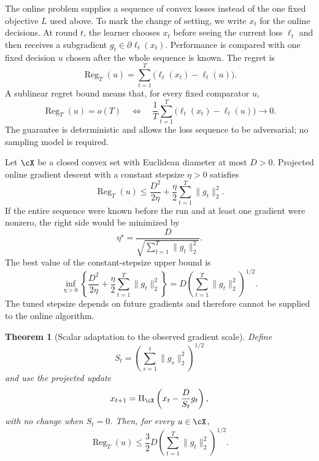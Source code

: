 \documentclass[11pt,twoside]{article}
\newtheorem{theorem}{Theorem}[section]
\theoremstyle{definition}
\theoremstyle{remark}
\begin{document}
The online problem supplies a sequence of convex losses instead of the one
fixed objective $L$ used above. To mark the change of setting, we write $x_t$
for the online decisions. At round $t$, the learner chooses $x_t$ before
seeing the current loss $\ell_t$ and then receives a subgradient
$g_t\in\partial\ell_t(x_t)$. Performance is compared with one fixed decision
$u$ chosen after the whole sequence is known. The regret is
\begin{equation}
 \operatorname{Reg}_T(u)
 =\sum_{t=1}^T\bigl(\ell_t(x_t)-\ell_t(u)\bigr).
 \label{eq:online-regret}
\end{equation}
A sublinear regret bound means that, for every fixed comparator $u$,
\begin{equation}
 \operatorname{Reg}_T(u)=o(T)
 \quad\Longleftrightarrow\quad
 \frac1T\sum_{t=1}^T
 \bigl(\ell_t(x_t)-\ell_t(u)\bigr)\longrightarrow0.
 \label{eq:sublinear-regret-meaning}
\end{equation}
The guarantee is deterministic and allows the loss sequence to be
adversarial; no sampling model is required.

Let $\cX$ be a closed convex set with Euclidean diameter at most $D>0$. Projected
online gradient descent with a constant stepsize $\eta>0$ satisfies
\begin{equation}
 \operatorname{Reg}_T(u)
 \le \frac{D^2}{2\eta}
      +\frac\eta2\sum_{t=1}^T\|g_t\|_2^2.
 \label{eq:fixed-eta-oco}
\end{equation}
If the entire sequence were known before the run and at least one gradient
were nonzero, the right side would be minimized by
\begin{equation}
 \eta^\star
 =\frac{D}{\sqrt{\sum_{t=1}^T\|g_t\|_2^2}}.
 \label{eq:hindsight-stepsize}
\end{equation}
The best value of the constant-stepsize upper bound is
\begin{equation}
 \inf_{\eta>0}
 \left\{
  \frac{D^2}{2\eta}
  +\frac\eta2\sum_{t=1}^T\|g_t\|_2^2
 \right\}
 =D\left(\sum_{t=1}^T\|g_t\|_2^2\right)^{1/2}.
 \label{eq:hindsight-bound-value}
\end{equation}
The tuned stepsize depends on future gradients and therefore cannot be
supplied to the online algorithm.

\begin{theorem}[Scalar adaptation to the observed gradient scale]
\label{thm:scalar-adaptation}
Define
\[
 S_t=\left(\sum_{s=1}^t\|g_s\|_2^2\right)^{1/2}
\]
and use the projected update
\begin{equation}
 x_{t+1}=\Pi_{\cX}\left(x_t-\frac{D}{S_t}g_t\right),
 \label{eq:scalar-adaptive-update}
\end{equation}
with no change when $S_t=0$. Then, for every $u\in\cX$,
\begin{equation}
 \operatorname{Reg}_T(u)
 \le\frac32D
      \left(\sum_{t=1}^T\|g_t\|_2^2\right)^{1/2}.
 \label{eq:scalar-adaptive-regret}
\end{equation}
\end{theorem}
\end{document}

